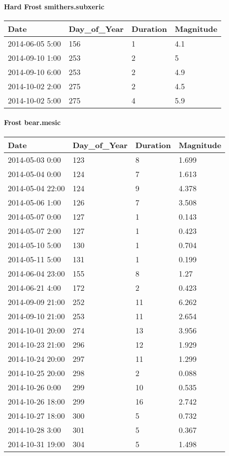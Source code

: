 \documentclass[
]{article}
\begin{document}
\hypertarget{hard-frost-smithers.subxeric}{%
\paragraph{Hard Frost
smithers.subxeric}\label{hard-frost-smithers.subxeric}}

\begin{tabular}{l|l|l|l}
\hline
Date & Day\_of\_Year & Duration & Magnitude\\
\hline
2014-06-05 5:00 & 156 & 1 & 4.1\\
\hline
2014-09-10 1:00 & 253 & 2 & 5\\
\hline
2014-09-10 6:00 & 253 & 2 & 4.9\\
\hline
2014-10-02 2:00 & 275 & 2 & 4.5\\
\hline
2014-10-02 5:00 & 275 & 4 & 5.9\\
\hline
\end{tabular}

\hypertarget{frost-bear.mesic}{%
\paragraph{Frost bear.mesic}\label{frost-bear.mesic}}

\begin{tabular}{l|l|l|l}
\hline
Date & Day\_of\_Year & Duration & Magnitude\\
\hline
2014-05-03 0:00 & 123 & 8 & 1.699\\
\hline
2014-05-04 0:00 & 124 & 7 & 1.613\\
\hline
2014-05-04 22:00 & 124 & 9 & 4.378\\
\hline
2014-05-06 1:00 & 126 & 7 & 3.508\\
\hline
2014-05-07 0:00 & 127 & 1 & 0.143\\
\hline
2014-05-07 2:00 & 127 & 1 & 0.423\\
\hline
2014-05-10 5:00 & 130 & 1 & 0.704\\
\hline
2014-05-11 5:00 & 131 & 1 & 0.199\\
\hline
2014-06-04 23:00 & 155 & 8 & 1.27\\
\hline
2014-06-21 4:00 & 172 & 2 & 0.423\\
\hline
2014-09-09 21:00 & 252 & 11 & 6.262\\
\hline
2014-09-10 21:00 & 253 & 11 & 2.654\\
\hline
2014-10-01 20:00 & 274 & 13 & 3.956\\
\hline
2014-10-23 21:00 & 296 & 12 & 1.929\\
\hline
2014-10-24 20:00 & 297 & 11 & 1.299\\
\hline
2014-10-25 20:00 & 298 & 2 & 0.088\\
\hline
2014-10-26 0:00 & 299 & 10 & 0.535\\
\hline
2014-10-26 18:00 & 299 & 16 & 2.742\\
\hline
2014-10-27 18:00 & 300 & 5 & 0.732\\
\hline
2014-10-28 3:00 & 301 & 5 & 0.367\\
\hline
2014-10-31 19:00 & 304 & 5 & 1.498\\
\hline
\end{tabular}
\end{document}
